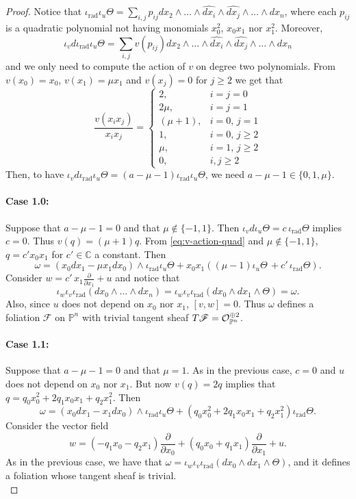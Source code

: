 \documentclass[10pt,a4paper]{amsart}
\def\CC{{\mathbb{C}}}
\newcommand{\del}[1]{\frac{\partial}{\partial #1}}
\newcommand{\opn}{{\mathcal O}_{\mathbb{P}^{n}}}
\newcommand{\pn}{{\mathbb{P}^{n}}}
\DeclareMathOperator{\rad}{rad}
\newcommand{\sF}{\mathscr{F}}
\newcommand{\tF}{{\rm T}\sF}
\begin{document}
\begin{proof}
 Notice that $\iota_{\rad}\iota_u \Theta = \sum_{i,j} p_{ij} dx_2\wedge \dots \wedge \widehat{dx_i} \wedge \widehat{dx_j} \wedge \dots \wedge dx_n $, where each $p_{ij}$ is a quadratic polynomial not having monomials $x_0^2$, $x_0x_1$ nor $x_1^2$. Moreover,
 \[
 \iota_v d\iota_{\rad} \iota_u \Theta = \sum_{i,j} v( p_{ij} ) dx_2\wedge \dots \wedge \widehat{dx_i} \wedge \widehat{dx_j} \wedge \dots \wedge dx_n
 \]
 and we only need to compute the action of $v$ on degree two polynomials. From $v(x_0) = x_0$, $v(x_1) = \mu x_1$ and $v(x_j) = 0$ for $j\geq 2$ we get that 
 \begin{equation} \label{eq:v-action-quad}
 \frac{v(x_ix_j)}{x_ix_j} = \begin{cases} 2, & i=j = 0\\ 2\mu , & i=j=1\\
 (\mu+1) , &i = 0, \, j = 1 \\ 
 1, & i = 0, \, j\geq 2 \\ \mu ,& i = 1,\, j \geq 2 \\ 0 , & i,j\geq 2 
 \end{cases} 
 \end{equation}
 Then, to have $\iota_v d\iota_{\rad}\iota_u \Theta= (a - \mu - 1)\iota_{\rad}\iota_u \Theta$, we need $a-\mu-1\in \{ 0, 1, \mu \}$. 
\\
 \paragraph{\textbf{Case 1.0:}} Suppose that $a-\mu-1 = 0$ and that $\mu \not\in \{ -1,1\}$. Then $\iota_v d \iota_u \Theta = c \, \iota_{\rad} \Theta$ implies $c =0$. Thus $v(q) = (\mu+1)q$. From \eqref{eq:v-action-quad} and $\mu \not\in \{ -1,1\}$, $q = c' x_0x_1$ for $c'\in \CC$ a constant.
 Then 
 \[
 \omega = (x_0 dx_1 - \mu x_1 dx_0) \wedge \iota_{\rad}\iota_u \Theta + x_0x_1((\mu-1)\iota_u \Theta \, + c'\, \iota_{\rad}\Theta). 
 \]
 Consider $w = c'\, x_1 \del{ x_1} + u$ and notice that 
 \[
 \iota_w\iota_v\iota_{\rad} (dx_0\wedge \dots \wedge dx_n) = \iota_w\iota_v\iota_{\rad} (dx_0\wedge dx_1 \wedge \Theta) = \omega. 
 \]
 Also, since $u$ does not depend on $x_0$ nor $x_1$, $[v,w] =0$. Thus $\omega$ defines a foliation $\sF$ on $\pn$ with trivial tangent sheaf $\tF = \opn^{\oplus 2}$. 

 \paragraph{\textbf{Case 1.1:}} Suppose that $a-\mu-1 = 0$ and that $\mu =1$. As in the previous case, $c=0$ and $u$ does not depend on $x_0$ nor $x_1$. But now $v(q) = 2 q$ implies that $q = q_{0}x_0^2 + 2q_{1}x_0x_1+ q_{2}x_1^2$. Then
 \[
 \omega = (x_0 dx_1 - x_1 dx_0) \wedge \iota_{\rad}\iota_u \Theta + (q_{0}x_0^2 + 2q_{1}x_0x_1+ q_{2}x_1^2) \iota_{\rad}\Theta.
 \]
 Consider the vector field
 \[
 w = \left( -q_1x_0 -q_2 x_1 \right)\del{ x_0} + \left(q_0x_0 +q_1x_1 \right)\del{ x_1} + u.
 \]
 As in the previous case, we have that $ \omega = \iota_w \iota_v\iota_{\rad} (dx_0\wedge dx_1 \wedge \Theta) $, and it defines a foliation whose tangent sheaf is trivial.
\\

\end{proof}
\end{document}
